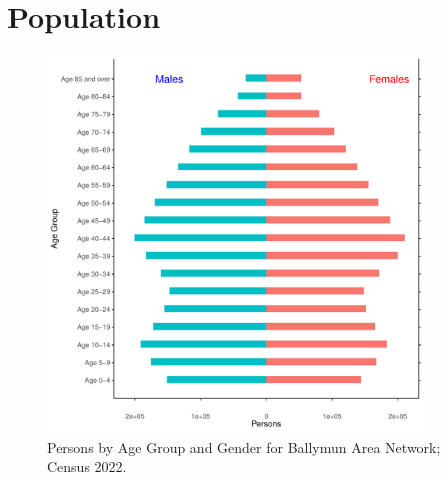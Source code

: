 \documentclass{article}
\begin{document}
\pagebreak

\section{Population} 
\label{sect:Pop}

\begin{figure}[h]
	\centering
	\includegraphics[width = 100mm]{../figures/PyramidPlot.pdf}
	\caption{Persons by Age Group and Gender for Ballymun Area Network; Census 2022.}
	\label{fig:2ae19629-1a6a-13a3-e055-000000000001}
	\end{figure}
\end{document}
